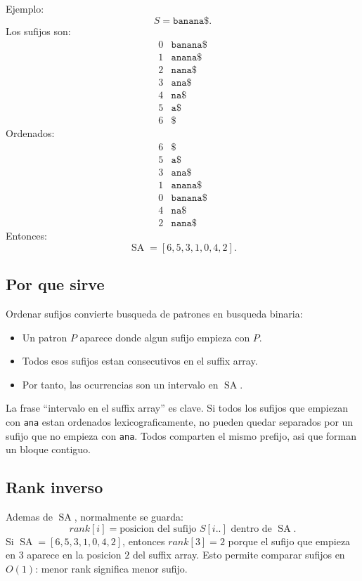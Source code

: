 \documentclass[10pt]{article}
\newcommand{\bigO}{O}
\newcommand{\SA}{\operatorname{SA}}
\begin{document}
Ejemplo:
\[
S=\texttt{banana\$}.
\]
Los sufijos son:
\[
\begin{array}{c|l}
0 & \texttt{banana\$}\\
1 & \texttt{anana\$}\\
2 & \texttt{nana\$}\\
3 & \texttt{ana\$}\\
4 & \texttt{na\$}\\
5 & \texttt{a\$}\\
6 & \texttt{\$}
\end{array}
\]
Ordenados:
\[
\begin{array}{c|l}
6 & \texttt{\$}\\
5 & \texttt{a\$}\\
3 & \texttt{ana\$}\\
1 & \texttt{anana\$}\\
0 & \texttt{banana\$}\\
4 & \texttt{na\$}\\
2 & \texttt{nana\$}
\end{array}
\]
Entonces:
\[
\SA=[6,5,3,1,0,4,2].
\]

\subsection{Por que sirve}
Ordenar sufijos convierte busqueda de patrones en busqueda binaria:
\begin{itemize}[leftmargin=*]
\item Un patron $P$ aparece donde algun sufijo empieza con $P$.
\item Todos esos sufijos estan consecutivos en el suffix array.
\item Por tanto, las ocurrencias son un intervalo en $\SA$.
\end{itemize}

La frase ``intervalo en el suffix array'' es clave. Si todos los sufijos que
empiezan con \texttt{ana} estan ordenados lexicograficamente, no pueden quedar
separados por un sufijo que no empieza con \texttt{ana}. Todos comparten el
mismo prefijo, asi que forman un bloque contiguo.

\subsection{Rank inverso}
Ademas de $\SA$, normalmente se guarda:
\[
rank[i]=\text{posicion del sufijo }S[i..]\text{ dentro de }\SA.
\]
Si $\SA=[6,5,3,1,0,4,2]$, entonces $rank[3]=2$ porque el sufijo que empieza en
$3$ aparece en la posicion $2$ del suffix array. Esto permite comparar sufijos
en $\bigO(1)$: menor rank significa menor sufijo.
\end{document}

